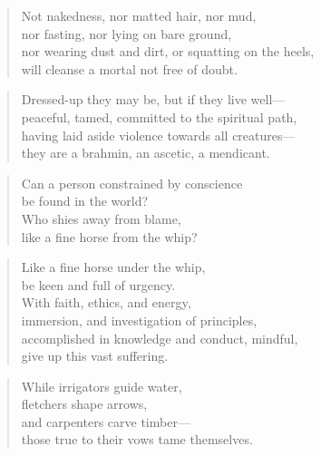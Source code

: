 \documentclass[12pt,openany]{book}%
\begin{document}
\begin{verse}%
Not nakedness, nor matted hair, nor mud, \\
nor fasting, nor lying on bare ground, \\
nor wearing dust and dirt, or squatting on the heels, \\
will cleanse a mortal not free of doubt. 

%
\end{verse}

\begin{verse}%
Dressed-up they may be, but if they live well—\\
peaceful, tamed, committed to the spiritual path, \\
having laid aside violence towards all creatures—\\
they are a brahmin, an ascetic, a mendicant. 

%
\end{verse}

\begin{verse}%
Can a person constrained by conscience \\
be found in the world? \\
Who shies away from blame, \\
like a fine horse from the whip? 

%
\end{verse}

\begin{verse}%
Like a fine horse under the whip, \\
be keen and full of urgency. \\
With faith, ethics, and energy, \\
immersion, and investigation of principles, \\
accomplished in knowledge and conduct, mindful, \\
give up this vast suffering. 

%
\end{verse}

\begin{verse}%
While irrigators guide water, \\
fletchers shape arrows, \\
and carpenters carve timber—\\
those true to their vows tame themselves. 

%
\end{verse}

%
\end{document}
